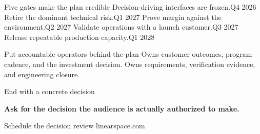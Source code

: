 \documentclass[aspectratio=169,professionalfonts]{beamer}
\begin{document}
\begin{LSMilestoneSlide}[
  background=milky-way-panorama,
  overlay=0.72,
  eyebrow={Synthetic execution plan}
]{Five gates make the plan credible}
    {Decision-driving interfaces are frozen.}{Q4 2026}
    {Retire the dominant technical risk.}{Q1 2027}
    {Prove margin against the environment.}{Q2 2027}
    {Validate operations with a launch customer.}{Q3 2027}
    {Release repeatable production capacity.}{Q1 2028}
\end{LSMilestoneSlide}

\begin{LSTeamSlide}[
  background=webb-clouds,
  overlay=0.72,
  eyebrow={Synthetic layout demonstration}
]{Put accountable operators behind the plan}
    {Owns customer outcomes, program cadence, and the investment decision.}
    {Owns requirements, verification evidence, and engineering closure.}
\end{LSTeamSlide}

\begin{frame}{End with a concrete decision}
  \vspace{0.15in}
  \hfill
  \hfill
  \vfill
  {\fontsize{28}{34}\selectfont\bfseries
  Ask for the decision the audience is actually authorized to make.\par}
\end{frame}

  {Schedule the decision review}
  {linearspace.com}

\LSAcronymFrame

\nocite{schaub2018}
\LSReferencesFrame
\end{document}
